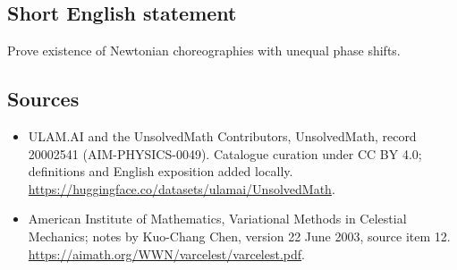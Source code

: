 \documentclass[11pt]{article}
\begin{document}
\subsection{Short English statement}
Prove existence of Newtonian choreographies with unequal phase shifts.
\subsection{Sources}
\begin{itemize}
\item[\hypertarget{source:20002541:1}{S1}] ULAM.AI and the UnsolvedMath Contributors, UnsolvedMath, record 20002541 (AIM-PHYSICS-0049). Catalogue curation under CC BY 4.0; definitions and English exposition added locally.
\url{https://huggingface.co/datasets/ulamai/UnsolvedMath}.
\item[\hypertarget{source:20002541:2}{S2}] American Institute of Mathematics, Variational Methods in Celestial Mechanics; notes by Kuo-Chang Chen, version 22 June 2003, source item 12.
\url{https://aimath.org/WWN/varcelest/varcelest.pdf}.
\end{itemize}
\label{end:20002541}
\end{document}
